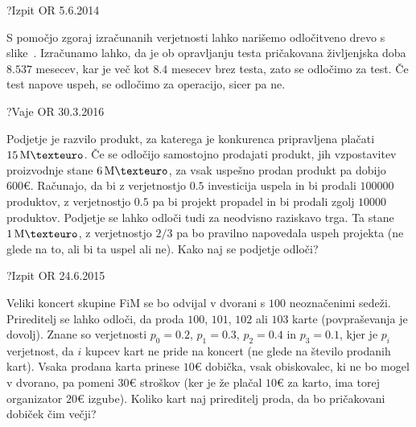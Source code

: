 \begin{naloga}{?}{Izpit OR 5.6.2014}
\begin{odgovor}
\begin{enumerate}[(a)]
S pomočjo zgoraj izračunanih verjetnosti
lahko narišemo odločitveno drevo s slike~\fig{}.
Izračunamo lahko, da je ob opravljanju testa
pričakovana življenjska doba $8.537$ mesecev,
kar je več kot $8.4$ mesecev brez testa,
zato se odločimo za test.
Če test napove uspeh, se odločimo za operacijo, sicer pa ne.
\end{enumerate}

\begin{slika}
\makebox[\textwidth][c]{
\pgfslika
}
\end{slika}
\end{odgovor}
\end{naloga}


\begin{naloga}{?}{Vaje OR 30.3.2016}
\begin{vprasanje}[produkt]
Podjetje je razvilo produkt,
za katerega je konkurenca pripravljena plačati $15 \ME$.
Če se odločijo samostojno prodajati produkt,
jih vzpostavitev proizvodnje stane $6 \ME$,
za vsak uspešno prodan produkt pa dobijo $600 €$.
Računajo, da bi z ve\-rjet\-nost\-jo $0.5$ investicija uspela
in bi prodali $100000$ produktov,
z verjetnostjo $0.5$ pa bi projekt propadel
in bi prodali zgolj $10000$ produktov.
Podjetje se lahko odloči tudi za neodvisno raziskavo trga.
Ta stane $1 \ME$,
z verjetnostjo $2/3$ pa bo pravilno napovedala uspeh projekta
(ne glede na to, ali bi ta uspel ali ne).
Kako naj se podjetje odloči?

\end{vprasanje}
\begin{odgovor}
\end{odgovor}
\end{naloga}


\begin{naloga}{?}{Izpit OR 24.6.2015}
\begin{vprasanje}[koncert]
Veliki koncert skupine FiM
se bo odvijal v dvorani s $100$ neoznačenimi sedeži.
Prireditelj se lahko odloči, da proda $100$, $101$, $102$ ali $103$ karte
(povpraševanja je dovolj).
Znane so verjetnosti $p_0 = 0.2$, $p_1 = 0.3$, $p_2 = 0.4$ in $p_3 = 0.1$,
kjer je $p_i$ verjetnost, da $i$ kupcev kart ne pride na koncert
(ne glede na število prodanih kart).
Vsaka prodana karta prinese $10 €$ dobička,
vsak obiskovalec, ki ne bo mogel v dvorano, pa pomeni $30 €$ stroškov
(ker je že plačal $10 €$ za karto, ima torej organizator $20 €$ izgube).
Koliko kart naj prireditelj proda, da bo pričakovani dobiček čim večji?

\end{vprasanje}
\begin{odgovor}
\end{odgovor}
\end{naloga}


